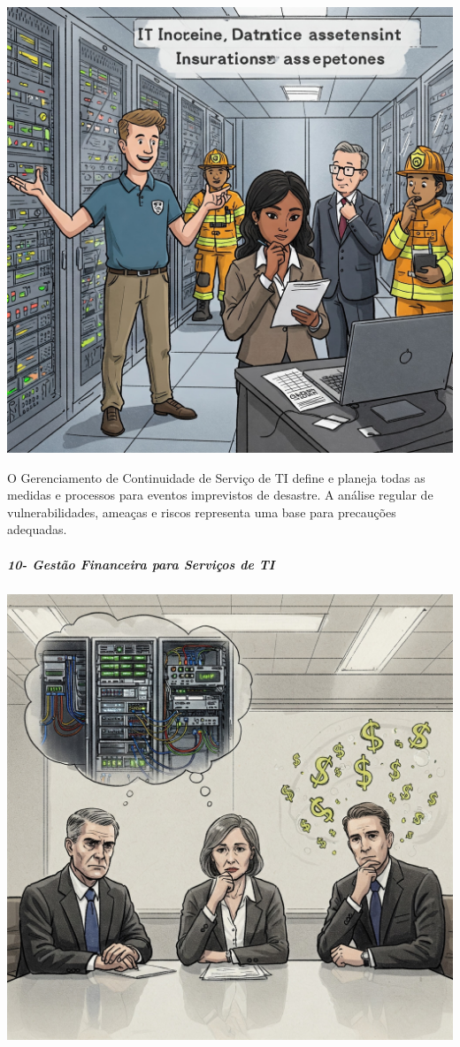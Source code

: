 \documentclass[
]{book}
\begin{document}
\includegraphics{images/InfraEstrutura/ITIL/09-Gestao_de_Continuidade_de_servicos_deTI.jpg}

O Gerenciamento de Continuidade de Serviço de TI define e planeja todas as medidas e processos para eventos imprevistos de desastre. A análise regular de vulnerabilidades, ameaças e riscos representa uma base para precauções adequadas.

\subparagraph{10- Gestão Financeira para Serviços de TI}\label{gestuxe3o-financeira-para-serviuxe7os-de-ti}

\includegraphics{images/InfraEstrutura/ITIL/10-Gestao_Financeira_servicos_TI.jpg}
\end{document}
